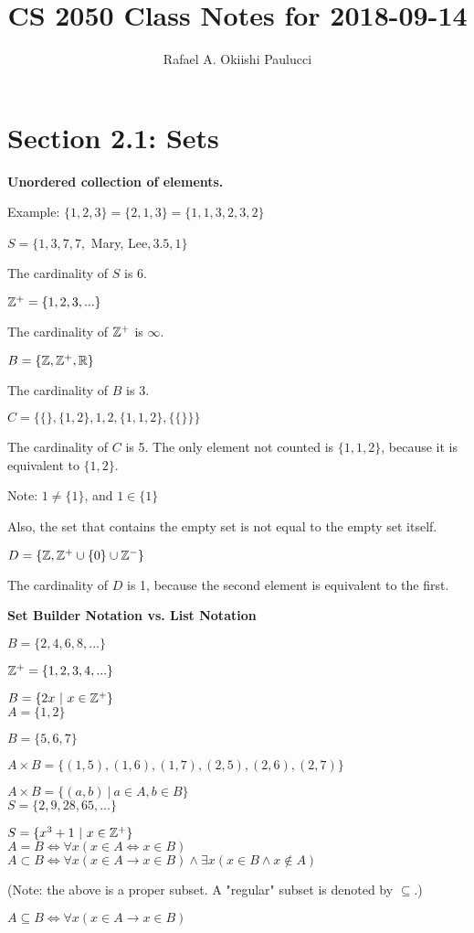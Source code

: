 \documentclass{exam}
\title{CS 2050 Class Notes for 2018-09-14}
\author{Rafael A. Okiishi Paulucci}
\date{}
\begin{document}
	\maketitle
	\section{Section 2.1: Sets}
	
	\textbf{Unordered collection of elements.}
	
	Example: $\{1,2,3\} = \{2,1,3\} = \{1,1,3,2,3,2\}$\newline
	
	$S = \{1,3,7,7,$ Mary, Lee$,3.5,1\}$
	
	The cardinality of $S$ is 6.
	
	$\Bbb Z^+ = \{ 1,2,3,... \}$
	
	The cardinality of $\Bbb Z^+$ is $\infty$.
	
	$B = \{\Bbb Z, \Bbb Z^+, \Bbb R \}$
	
	The cardinality of $B$ is 3.
	
	$C = \{ \{\}, \{1,2\},1,2,\{1,1,2 \}, \{\{\}\} \}$
	
	The cardinality of $C$ is 5. The only element not counted is $\{1,1,2 \}$, because it is equivalent to $\{1,2\}$.
	
	Note: $1 \neq \{1\}$, and $1 \in \{1\}$
	
	Also, the set that contains the empty set is not equal to the empty set itself.
	
	$D = \{\Bbb Z, \Bbb Z^+ \cup \{0\} \cup \Bbb Z^- \}$
	
	The cardinality of $D$ is 1, because the second element is equivalent to the first.\newline
	
	\noindent
	\textbf{Set Builder Notation vs. List Notation}
	
	$B = \{2,4,6,8,...\}$
	
	$\Bbb Z^+ = \{ 1,2,3,4,... \}$
	
	$B = \{ 2x \ | \ x \in \Bbb Z^+\}$ \\
	
	$A = \{1,2\}$
	
	$B = \{5,6,7\}$ 
	
	$A \times B = \{ (1,5),(1,6),(1,7),(2,5),(2,6),(2,7) \}$
	
	$A \times B = \{ (a,b) \ |\ a \in A, b \in B \}$\\
	
	$S = \{2,9,28,65,...\}$
	
	$S = \{ x^3 + 1 \ | \ x \in \Bbb Z^+ \}$\\
	
	$A = B \iff \forall x (x \in A \iff x \in B)$\\
	
	$A \subset B \iff \forall x (x \in A \rightarrow x \in B) \wedge \exists x (x \in B \wedge x \not\in A)$
	
	(Note: the above is a proper subset. A "regular" subset is denoted by $\subseteq$.)
	
	$A \subseteq B \iff \forall x (x \in A \rightarrow x \in B)$

	
\end{document}
